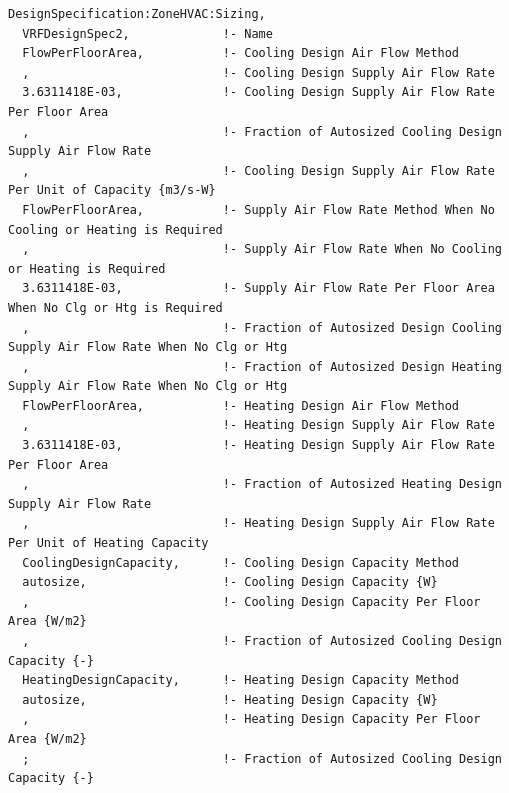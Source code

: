 \begin{lstlisting}
DesignSpecification:ZoneHVAC:Sizing,
  VRFDesignSpec2,             !- Name
  FlowPerFloorArea,           !- Cooling Design Air Flow Method
  ,                           !- Cooling Design Supply Air Flow Rate
  3.6311418E-03,              !- Cooling Design Supply Air Flow Rate Per Floor Area
  ,                           !- Fraction of Autosized Cooling Design Supply Air Flow Rate
  ,                           !- Cooling Design Supply Air Flow Rate Per Unit of Capacity {m3/s-W}
  FlowPerFloorArea,           !- Supply Air Flow Rate Method When No Cooling or Heating is Required
  ,                           !- Supply Air Flow Rate When No Cooling or Heating is Required
  3.6311418E-03,              !- Supply Air Flow Rate Per Floor Area When No Clg or Htg is Required
  ,                           !- Fraction of Autosized Design Cooling Supply Air Flow Rate When No Clg or Htg
  ,                           !- Fraction of Autosized Design Heating Supply Air Flow Rate When No Clg or Htg
  FlowPerFloorArea,           !- Heating Design Air Flow Method
  ,                           !- Heating Design Supply Air Flow Rate
  3.6311418E-03,              !- Heating Design Supply Air Flow Rate Per Floor Area
  ,                           !- Fraction of Autosized Heating Design Supply Air Flow Rate
  ,                           !- Heating Design Supply Air Flow Rate Per Unit of Heating Capacity
  CoolingDesignCapacity,      !- Cooling Design Capacity Method
  autosize,                   !- Cooling Design Capacity {W}
  ,                           !- Cooling Design Capacity Per Floor Area {W/m2}
  ,                           !- Fraction of Autosized Cooling Design Capacity {-}
  HeatingDesignCapacity,      !- Heating Design Capacity Method
  autosize,                   !- Heating Design Capacity {W}
  ,                           !- Heating Design Capacity Per Floor Area {W/m2}
  ;                           !- Fraction of Autosized Cooling Design Capacity {-}


\end{lstlisting}
